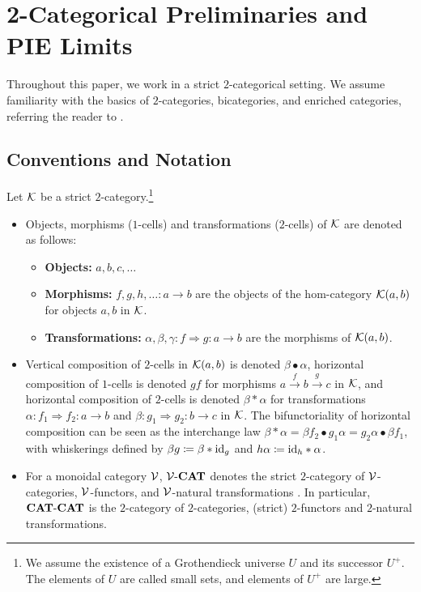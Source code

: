 
\section{2-Categorical Preliminaries and PIE Limits}\label{sec:preliminaries}

Throughout this paper, we work in a strict $2$-categorical setting. We assume familiarity with the basics of $2$-categories, bicategories, and enriched categories, referring the reader to \cite{Kelly:Enriched, lack2CategoriesCompanion2010}.

\subsection{Conventions and Notation}
Let $\mathcal{K}$ be a strict $2$-category.\footnote{We assume the existence of a Grothendieck universe $U$ and its successor $U^+$. The elements of $U$ are called small sets, and elements of $U^+$ are large.}
\begin{itemize}
    \item Objects, morphisms ($1$-cells) and transformations ($2$-cells) of $\mathcal{K}$ are denoted as follows:\begin{itemize}
        \item \textbf{Objects:} $a,b,c,\ldots$
        \item \textbf{Morphisms:} $f,g,h,\ldots \colon a\to b$ are the objects of the hom-category $\mathcal{K}(a,b)$ for objects $a,b$ in $\mathcal{K}$.
        \item \textbf{Transformations:} $\alpha,\beta,\gamma\colon f\Rightarrow g\colon a\to b$ are the morphisms of $\mathcal{K}(a,b)$.
    \end{itemize}
    \item Vertical composition of $2$-cells in $\mathcal{K}(a,b)$ is denoted $\beta \bullet \alpha$, horizontal composition of $1$-cells is denoted $gf$ for morphisms $a\xrightarrow{f}b\xrightarrow{g} c$ in $\mathcal{K}$, and horizontal composition of $2$-cells is denoted $\beta * \alpha$ for transformations $\alpha\colon f_1\Rightarrow f_2\colon a\to b$ and $\beta\colon g_1\Rightarrow g_2\colon b\to c$ in $\mathcal{K}$. The bifunctoriality of horizontal composition can be seen as the interchange law $\beta * \alpha = \beta f_2 \bullet g_1\alpha = g_2\alpha \bullet \beta f_1$, with whiskerings defined by $\beta g \coloneqq \beta * \mathrm{id}_g$ and $h\alpha \coloneqq \mathrm{id}_h * \alpha$.
    \item For a monoidal category $\mathcal{V}$, $\mathcal{V}\text{-}\mathbf{CAT}$ denotes the strict $2$-category of $\mathcal{V}$-categories, $\mathcal{V}$-functors, and $\mathcal{V}$-natural transformations \cite{Kelly:Enriched}. In particular, $\mathbf{CAT}\text{-}\mathbf{CAT}$ is the $2$-category of $2$-categories, (strict) $2$-functors and $2$-natural transformations.
\end{itemize}

